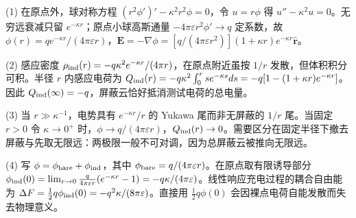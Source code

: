 (1) 在原点外，球对称方程 \((r^2\phi')'-\kappa^2r^2\phi=0\)，令 \(u=r\phi\) 得 \(u''-\kappa^2u=0\)。无穷远衰减只留 \(e^{-\kappa r}\)；原点小球高斯通量 \(-4\pi\varepsilon r^2\phi'\to q\) 定系数，故 \(\phi(r)=q e^{-\kappa r}/(4\pi\varepsilon r)\)，\(\boldsymbol E=-\nabla\phi=[q/(4\pi\varepsilon r^2)](1+\kappa r)e^{-\kappa r}\hat{\boldsymbol r}\)。

(2) 感应密度 \(\rho_{\rm ind}(r)=-q\kappa^2e^{-\kappa r}/(4\pi r)\)，在原点附近虽按 \(1/r\) 发散，但体积积分可积。半径 \(r\) 内感应电荷为 \(Q_{\rm ind}(r)=-q\kappa^2\int_0^r s e^{-\kappa s}ds=-q[1-(1+\kappa r)e^{-\kappa r}]\)。因此 \(Q_{\rm ind}(\infty)=-q\)，屏蔽云恰好抵消测试电荷的总电量。

(3) 当 \(r\gg\kappa^{-1}\)，电势具有 \(e^{-\kappa r}/r\) 的 Yukawa 尾而非无屏蔽的 \(1/r\) 尾。当固定 \(r>0\) 令 \(\kappa\to0^+\) 时，\(\phi\to q/(4\pi\varepsilon r)\)，\(Q_{\rm ind}(r)\to0\)。需要区分在固定半径下撤去屏蔽与先取无限远：两极限一般不可对调，因为总屏蔽云被推向无限远。

(4) 写 \(\phi=\phi_{\rm bare}+\phi_{\rm ind}\)，其中 \(\phi_{\rm bare}=q/(4\pi\varepsilon r)\)。在原点取有限诱导部分 \(\phi_{\rm ind}(0)=\lim_{r\to0}{q\over4\pi\varepsilon r}(e^{-\kappa r}-1)=-q\kappa/(4\pi\varepsilon)\)。线性响应充电过程的耦合自由能为 \(\Delta F=\tfrac12 q\phi_{\rm ind}(0)=-q^2\kappa/(8\pi\varepsilon)\)。直接用 \(\tfrac12q\phi(0)\) 会因裸点电荷自能发散而失去物理意义。
